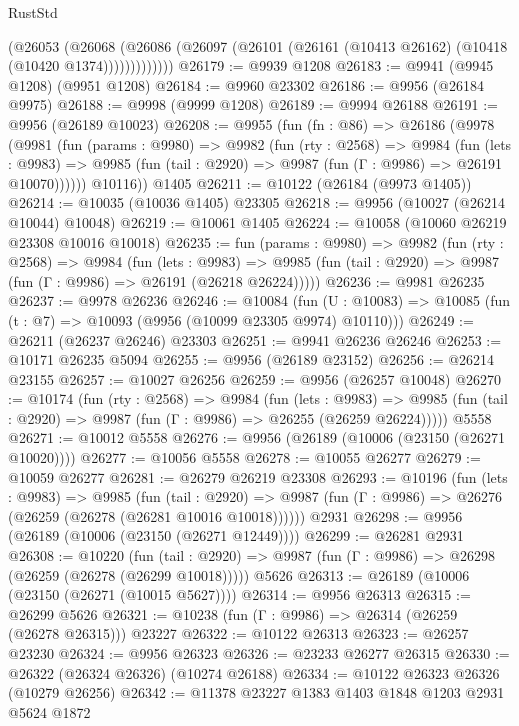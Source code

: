 \begin{lexlean}{RustStd}
\begin{coremodule}
              (@26053
                (@26068
                  (@26086 (@26097 (@26101 (@26161 (@10413 @26162) (@10418 (@10420 @1374)))))))))))))
@26179 := @9939 @1208
@26183 := @9941 (@9945 @1208) (@9951 @1208)
@26184 := @9960 @23302
@26186 := @9956 (@26184 @9975)
@26188 := @9998 (@9999 @1208)
@26189 := @9994 @26188
@26191 := @9956 (@26189 @10023)
@26208 := @9955
    (fun (fn : @86) =>
    @26186
      (@9978
        (@9981
          (fun (params : @9980) =>
          @9982
            (fun (rty : @2568) =>
            @9984
              (fun (lets : @9983) =>
              @9985 (fun (tail : @2920) => @9987 (fun (Γ : @9986) => @26191 @10070))))))
        @10116))
    @1405
@26211 := @10122 (@26184 (@9973 @1405))
@26214 := @10035 (@10036 @1405) @23305
@26218 := @9956 (@10027 (@26214 @10044) @10048)
@26219 := @10061 @1405
@26224 := @10058 (@10060 @26219 @23308 @10016 @10018)
@26235 := fun (params : @9980) =>
  @9982
    (fun (rty : @2568) =>
    @9984
      (fun (lets : @9983) =>
      @9985 (fun (tail : @2920) => @9987 (fun (Γ : @9986) => @26191 (@26218 @26224)))))
@26236 := @9981 @26235
@26237 := @9978 @26236
@26246 := @10084
    (fun (U : @10083) => @10085 (fun (t : @7) => @10093 (@9956 (@10099 @23305 @9974) @10110)))
@26249 := @26211 (@26237 @26246) @23303
@26251 := @9941 @26236 @26246
@26253 := @10171 @26235 @5094
@26255 := @9956 (@26189 @23152)
@26256 := @26214 @23155
@26257 := @10027 @26256
@26259 := @9956 (@26257 @10048)
@26270 := @10174
    (fun (rty : @2568) =>
    @9984
      (fun (lets : @9983) =>
      @9985 (fun (tail : @2920) => @9987 (fun (Γ : @9986) => @26255 (@26259 @26224)))))
    @5558
@26271 := @10012 @5558
@26276 := @9956 (@26189 (@10006 (@23150 (@26271 @10020))))
@26277 := @10056 @5558
@26278 := @10055 @26277
@26279 := @10059 @26277
@26281 := @26279 @26219 @23308
@26293 := @10196
    (fun (lets : @9983) =>
    @9985
      (fun (tail : @2920) =>
      @9987 (fun (Γ : @9986) => @26276 (@26259 (@26278 (@26281 @10016 @10018))))))
    @2931
@26298 := @9956 (@26189 (@10006 (@23150 (@26271 @12449))))
@26299 := @26281 @2931
@26308 := @10220
    (fun (tail : @2920) => @9987 (fun (Γ : @9986) => @26298 (@26259 (@26278 (@26299 @10018)))))
    @5626
@26313 := @26189 (@10006 (@23150 (@26271 (@10015 @5627))))
@26314 := @9956 @26313
@26315 := @26299 @5626
@26321 := @10238 (fun (Γ : @9986) => @26314 (@26259 (@26278 @26315))) @23227
@26322 := @10122 @26313
@26323 := @26257 @23230
@26324 := @9956 @26323
@26326 := @23233 @26277 @26315
@26330 := @26322 (@26324 @26326) (@10274 @26188)
@26334 := @10122 @26323 @26326 (@10279 @26256)
@26342 := @11378 @23227 @1383 @1403 @1848 @1203 @2931 @5624 @1872

\end{coremodule}
\end{lexlean}
